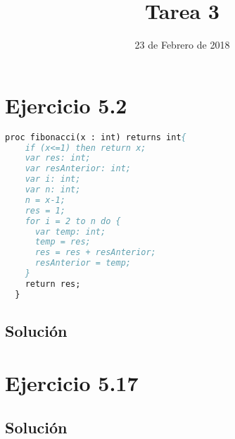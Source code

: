 \documentclass[11pt, a4paper, titlepage]{article}
\begin{document}
\title{Tarea 3}
\date{23 de Febrero de 2018}
\maketitle
\newpage



\section*{Ejercicio 5.2}

\begin{lstlisting}[language=pascal]
  proc fibonacci(x : int) returns int{
    if (x<=1) then return x;
    var res: int;
    var resAnterior: int;
    var i: int;
    var n: int;
    n = x-1;
    res = 1;
    for i = 2 to n do {
      var temp: int;
      temp = res;
      res = res + resAnterior;
      resAnterior = temp;
    }
    return res;
  }
\end{lstlisting}
\subsection*{Solución}

\section*{Ejercicio 5.17}
\subsection*{Solución}
\end{document}

